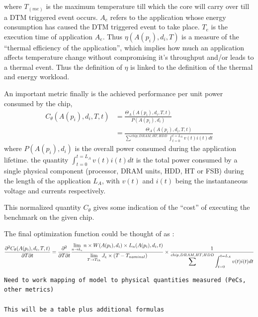 \documentclass[acmtaco]{acmtrans2m}
\begin{document}
where $T_(me)$ is the maximum temperature till which the core will carry
over till a DTM triggered event occurs. $A_e$ refers to the application
whose energy consumption has caused the DTM triggered event to take
place. $T_e$ is the execution time of application $A_e$. Thus
$\eta(A(p_i), d_i,T)$ is a measure of the ``thermal efficiency of the
application'', which implies how much an application affects temperature
change without compromising it's throughput and/or leads to a thermal
event. Thus the definition of $\eta$ is linked to the definition of the
thermal and energy workload.

An important metric finally is the achieved performance per unit power
consumed by the chip,
\begin{align}
C_{\theta}(A(p_i), d_i, T, t) &= \frac{\Theta_A(A(p_i),d_i, T, t)}{P(A(p_i),d_i)} \nonumber\\
	             			 &= \frac{\Theta_A(A(p_i),d_i, T, t)}{\displaystyle \sum^{chip,DRAM,HT,HDD} \int_{t=0}^{t=L_A}v(t)i(t)dt} \nonumber
\end{align}
where $P(A(p_i),d_i)$ is the overall power consumed during the
application lifetime. the quantity $\int_{t=0}^{t=L_A}v(t)i(t)dt$ is the
total power consumed by a single physical component (processor, DRAM
units, HDD, HT or FSB) during the length of the application $L_A$, with
$v(t)$ and $i(t)$ being the instantaneous voltage and currents
respectively.

This normalized quantity $C_\theta$ gives some indication of the
``cost'' of executing the benchmark on the given chip.

The final optimization function could be thought of as :
\begin{equation}
\frac{\partial^2 C_{\theta}(A(p_i), d_i, T, t)}{\partial T \partial t} = \frac{\partial^2}{\partial T \partial t} \frac{\displaystyle \lim_{n \to k_e }n \times W(A(p_i),d_i) \times L_n(A(p_i),d_i,t)}{\displaystyle \lim_{T \to T_{th}} J_e \times (T - T_{nominal})} \\
											       \times \frac{1}{\displaystyle \sum^{chip,DRAM,HT,HDD} \int_{t=0}^{t=L_A}v(t)i(t)dt} \nonumber
\end{equation}

\begin{verbatim}
Need to work mapping of model to physical quantities measured (PeCs,
other metrics)

This will be a table plus additional formulas
\end{verbatim}
\end{document}
